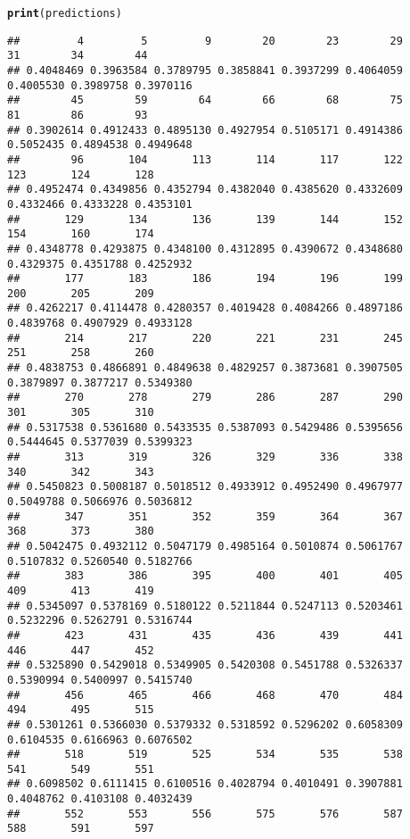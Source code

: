 \documentclass{article}\usepackage[]{graphicx}\usepackage[]{xcolor}
\makeatletter
\newcommand{\hlstd}[1]{\textcolor[rgb]{0.345,0.345,0.345}{#1}}%
\newcommand{\hlkwd}[1]{\textcolor[rgb]{0.737,0.353,0.396}{\textbf{#1}}}%
\newenvironment{kframe}{%
 \def\at@end@of@kframe{}%
 \ifinner\ifhmode%
  \def\at@end@of@kframe{\end{minipage}}%
  \begin{minipage}{\columnwidth}%
 \fi\fi%
 \def\FrameCommand##1{\hskip\@totalleftmargin \hskip-\fboxsep
 \colorbox{shadecolor}{##1}\hskip-\fboxsep
     \hskip-\linewidth \hskip-\@totalleftmargin \hskip\columnwidth}%
 \MakeFramed {\advance\hsize-\width
   \@totalleftmargin\z@ \linewidth\hsize
   \@setminipage}}%
 {\par\unskip\endMakeFramed%
 \at@end@of@kframe}
\newenvironment{knitrout}{}{} %
\makeatother
\begin{document}
\begin{knitrout}
\begin{kframe}
\begin{alltt}
\hlkwd{print}\hlstd{(predictions)}
\end{alltt}
\begin{verbatim}
##         4         5         9        20        23        29        31        34        44 
## 0.4048469 0.3963584 0.3789795 0.3858841 0.3937299 0.4064059 0.4005530 0.3989758 0.3970116 
##        45        59        64        66        68        75        81        86        93 
## 0.3902614 0.4912433 0.4895130 0.4927954 0.5105171 0.4914386 0.5052435 0.4894538 0.4949648 
##        96       104       113       114       117       122       123       124       128 
## 0.4952474 0.4349856 0.4352794 0.4382040 0.4385620 0.4332609 0.4332466 0.4333228 0.4353101 
##       129       134       136       139       144       152       154       160       174 
## 0.4348778 0.4293875 0.4348100 0.4312895 0.4390672 0.4348680 0.4329375 0.4351788 0.4252932 
##       177       183       186       194       196       199       200       205       209 
## 0.4262217 0.4114478 0.4280357 0.4019428 0.4084266 0.4897186 0.4839768 0.4907929 0.4933128 
##       214       217       220       221       231       245       251       258       260 
## 0.4838753 0.4866891 0.4849638 0.4829257 0.3873681 0.3907505 0.3879897 0.3877217 0.5349380 
##       270       278       279       286       287       290       301       305       310 
## 0.5317538 0.5361680 0.5433535 0.5387093 0.5429486 0.5395656 0.5444645 0.5377039 0.5399323 
##       313       319       326       329       336       338       340       342       343 
## 0.5450823 0.5008187 0.5018512 0.4933912 0.4952490 0.4967977 0.5049788 0.5066976 0.5036812 
##       347       351       352       359       364       367       368       373       380 
## 0.5042475 0.4932112 0.5047179 0.4985164 0.5010874 0.5061767 0.5107832 0.5260540 0.5182766 
##       383       386       395       400       401       405       409       413       419 
## 0.5345097 0.5378169 0.5180122 0.5211844 0.5247113 0.5203461 0.5232296 0.5262791 0.5316744 
##       423       431       435       436       439       441       446       447       452 
## 0.5325890 0.5429018 0.5349905 0.5420308 0.5451788 0.5326337 0.5390994 0.5400997 0.5415740 
##       456       465       466       468       470       484       494       495       515 
## 0.5301261 0.5366030 0.5379332 0.5318592 0.5296202 0.6058309 0.6104535 0.6166963 0.6076502 
##       518       519       525       534       535       538       541       549       551 
## 0.6098502 0.6111415 0.6100516 0.4028794 0.4010491 0.3907881 0.4048762 0.4103108 0.4032439 
##       552       553       556       575       576       587       588       591       597 

\end{verbatim}
\end{kframe}
\end{knitrout}
\end{document}
